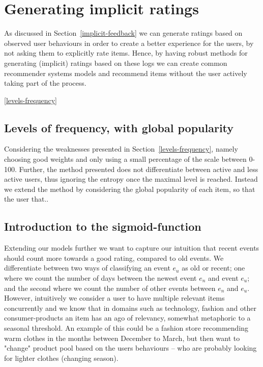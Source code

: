 
\section{Generating implicit ratings}

As discussed in Section~\ref{implicit-feedback} we can generate ratings based
on observed user behaviours in order to create a better experience for the
users, by not asking them to explicitly rate items. Hence, by having robust
methods for generating (implicit) ratings based on these logs we can create
common recommender systems models and recommend items without the user actively
taking part of the process.

\ref{levels-frequency}
\subsection{Levels of frequency, with global popularity}

Considering the weaknesses presented in Section~\ref{levels-frequency}, namely
choosing good weights and only using a small percentage of the scale between
0-100. Further, the method presented does not differentiate between active and
less active users, thus ignoring the entropy once the maximal level is reached.
Instead we extend the method by considering the global popularity of each item,
so that the user that.. 

\subsection{Introduction to the sigmoid-function}

Extending our models further we want to capture our intuition that recent
events should count more towards a good rating, compared to old events. We
differentiate between two ways of classifying an event $e_u$ as old or recent;
one where we count the number of days between the newest event $e_n$ and event
$e_u$; and the second where we count the number of other events between $e_n$
and $e_u$. However, intuitively we consider a user to have multiple relevant
items concurrently and we know that in domains such as technology, fashion and
other consumer-products an item has an ago of relevancy, somewhat metaphoric to
a seasonal threshold. An example of this could be a fashion store recommending
warm clothes in the months between December to March, but then want to "change"
product pool based on the users behaviours – who are probably looking for
lighter clothes (changing season).

